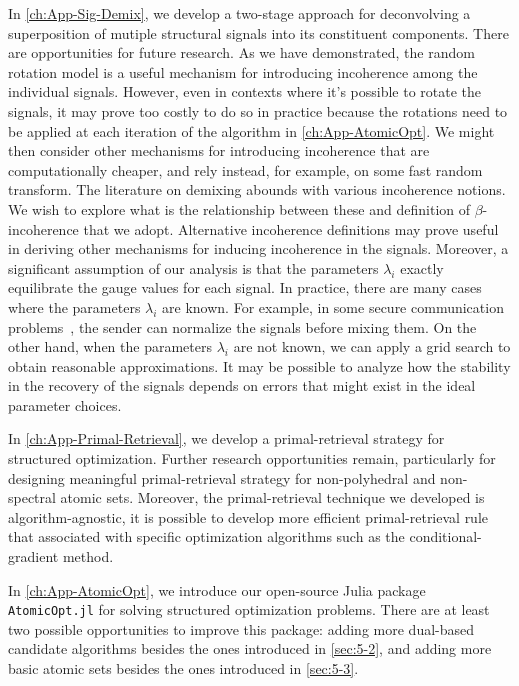 In \autoref{ch:App-Sig-Demix}, we develop a two-stage approach for deconvolving a superposition of mutiple structural signals into its constituent components. There are opportunities for future research. As we have demonstrated, the random rotation model is a useful mechanism for introducing incoherence among the individual signals. However, even in contexts where it's possible to rotate the signals, it may prove too costly to do so in practice because the rotations need to be applied at each iteration of the algorithm in \autoref{ch:App-AtomicOpt}. We might then consider other mechanisms for introducing incoherence that are computationally cheaper, and rely instead, for example, on some fast random transform. The literature on demixing abounds with various incoherence notions. We wish to explore what is the relationship between these and definition of $\beta$-incoherence that we adopt. Alternative incoherence definitions may prove useful in deriving other mechanisms for inducing incoherence in the signals. Moreover, a significant assumption of our analysis is that the parameters $\lambda_i$ exactly equilibrate the gauge values for each signal. In practice, there are many cases where the parameters $\lambda_i$ are known. For example, in some secure communication problems~\citep[Section~1.3.1]{mccoy2014sharp}, the sender can normalize the signals before mixing them. On the other hand, when the parameters $\lambda_i$ are not known, we can apply a grid search to obtain reasonable approximations. It may be possible to analyze how the stability in the recovery of the signals depends on errors that might exist in the ideal parameter choices.

In \autoref{ch:App-Primal-Retrieval}, we develop a primal-retrieval strategy for structured optimization. Further research opportunities remain, particularly for designing meaningful primal-retrieval strategy for non-polyhedral and non-spectral atomic sets. Moreover, the primal-retrieval technique we developed is algorithm-agnostic, it is possible to develop more efficient primal-retrieval rule that associated with specific optimization algorithms such as the conditional-gradient method.

In \autoref{ch:App-AtomicOpt}, we introduce our open-source Julia package \texttt{AtomicOpt.jl} for solving structured optimization problems. There are at least two possible opportunities to improve this package: adding more dual-based candidate algorithms besides the ones introduced in \autoref{sec:5-2}, and adding more basic atomic sets besides the ones introduced in \autoref{sec:5-3}. 

